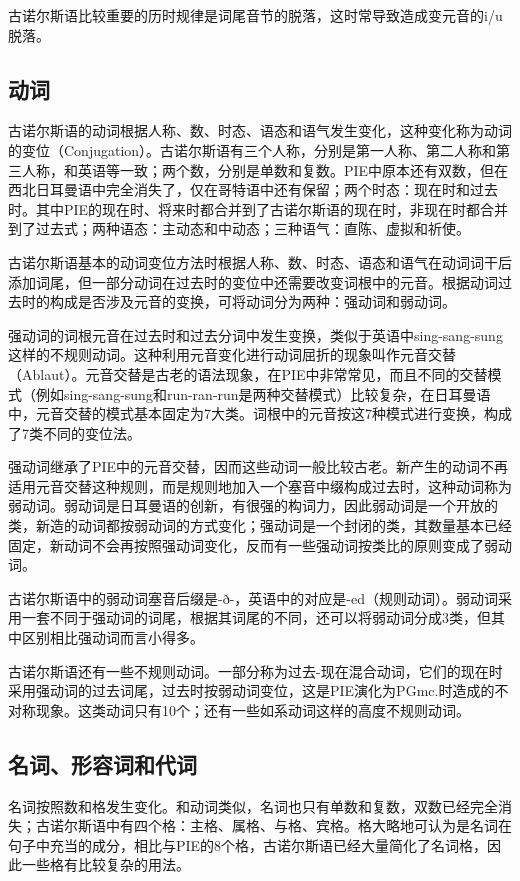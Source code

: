 古诺尔斯语比较重要的历时规律是词尾音节的脱落，这时常导致造成变元音的i/u脱落。

\subsection*{动词}
古诺尔斯语的动词根据人称、数、时态、语态和语气发生变化，这种变化称为动词的变位（Conjugation）。古诺尔斯语有三个人称，分别是第一人称、第二人称和第三人称，和英语等一致；两个数，分别是单数和复数。PIE中原本还有双数，但在西北日耳曼语中完全消失了，仅在哥特语中还有保留；两个时态：现在时和过去时。其中PIE的现在时、将来时都合并到了古诺尔斯语的现在时，非现在时都合并到了过去式；两种语态：主动态和中动态；三种语气：直陈、虚拟和祈使。

古诺尔斯语基本的动词变位方法时根据人称、数、时态、语态和语气在动词词干后添加词尾，但一部分动词在过去时的变位中还需要改变词根中的元音。根据动词过去时的构成是否涉及元音的变换，可将动词分为两种：强动词和弱动词。

强动词的词根元音在过去时和过去分词中发生变换，类似于英语中sing-sang-sung这样的不规则动词。这种利用元音变化进行动词屈折的现象叫作元音交替（Ablaut）。元音交替是古老的语法现象，在PIE中非常常见，而且不同的交替模式（例如sing-sang-sung和run-ran-run是两种交替模式）比较复杂，在日耳曼语中，元音交替的模式基本固定为7大类。词根中的元音按这7种模式进行变换，构成了7类不同的变位法。

强动词继承了PIE中的元音交替，因而这些动词一般比较古老。新产生的动词不再适用元音交替这种规则，而是规则地加入一个塞音中缀构成过去时，这种动词称为弱动词。弱动词是日耳曼语的创新，有很强的构词力，因此弱动词是一个开放的类，新造的动词都按弱动词的方式变化；强动词是一个封闭的类，其数量基本已经固定，新动词不会再按照强动词变化，反而有一些强动词按类比的原则变成了弱动词。

古诺尔斯语中的弱动词塞音后缀是-ð-，英语中的对应是-ed（规则动词）。弱动词采用一套不同于强动词的词尾，根据其词尾的不同，还可以将弱动词分成3类，但其中区别相比强动词而言小得多。

古诺尔斯语还有一些不规则动词。一部分称为过去-现在混合动词，它们的现在时采用强动词的过去词尾，过去时按弱动词变位，这是PIE演化为PGmc.时造成的不对称现象。这类动词只有10个；还有一些如系动词这样的高度不规则动词。

\subsection*{名词、形容词和代词}
名词按照数和格发生变化。和动词类似，名词也只有单数和复数，双数已经完全消失；古诺尔斯语中有四个格：主格、属格、与格、宾格。格大略地可认为是名词在句子中充当的成分，相比与PIE的8个格，古诺尔斯语已经大量简化了名词格，因此一些格有比较复杂的用法。

